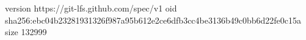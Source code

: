 version https://git-lfs.github.com/spec/v1
oid sha256:ebc04b23281931326f987a95b612e2ce6dfb3cc4be3136b49c0bb6d22fe0c15a
size 132999
